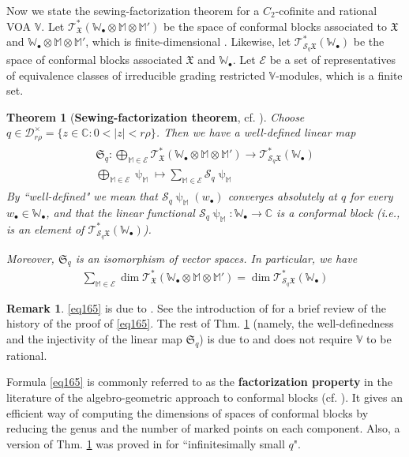 \documentclass[11pt,b5paper,notitlepage]{article}
\theoremstyle{definition}
\newtheorem{rem}[df]{Remark}
\theoremstyle{plain}
\newtheorem{thm}[df]{Theorem}
\newcommand{\fk}{\mathfrak}
\newcommand{\mc}{\mathcal}
\newcommand{\scr}{\mathscr}
\newcommand{\blt}{\bullet}
\newcommand{\Vbb}{\mathbb V}
\newcommand{\Wbb}{\mathbb W}
\newcommand{\Mbb}{\mathbb M}
\newcommand{\Cbb}{\mathbb C}
\newcommand{\<}{\left\langle}
\renewcommand{\>}{\right\rangle}
\newcommand{\fx}{\mathfrak{X}}
\numberwithin{equation}{subsection}
\begin{document}
Now we state the sewing-factorization theorem for a $C_2$-cofinite and rational VOA $\Vbb$. Let $\scr T_{\fx}^*(\Wbb_\blt\otimes\Mbb\otimes\Mbb')$ be the space of conformal blocks associated to $\fx$ and $\Wbb_\blt\otimes\Mbb\otimes\Mbb'$, which is finite-dimensional \cite{AN03-finite-dimensional,DGT2}. Likewise, let $\scr T_{\mc S_q\fx}^*(\Wbb_\blt)$ be the space of conformal blocks associated $\fx$ and $\Wbb_\blt$. Let $\mc E$ be a set of representatives of equivalence classes of irreducible grading restricted $\Vbb$-modules, which is a finite set.

\begin{thm}[\textbf{Sewing-factorization theorem}, cf. {\cite[Thm. 12.1]{Gui-sewingconvergence}}]  \label{lb77}
Choose $q\in\mc D_{r\rho}^\times=\{z\in\Cbb:0<|z|<r\rho\}$. Then we have a well-defined linear map
\begin{gather}\label{eq170}
\begin{gathered}
\fk S_q:\bigoplus_{\Mbb\in\mc E} \scr T_{\fx}^*(\Wbb_\blt\otimes\Mbb\otimes\Mbb')\rightarrow \scr T_{\mc S_q\fx}^*(\Wbb_\blt)\\
\bigoplus_{\Mbb\in\mc E}\uppsi_\Mbb\mapsto \sum_{\Mbb\in\mc E} \mc S_q\uppsi_\Mbb
\end{gathered}
\end{gather}
By ``well-defined" we mean that  $\mc S_q\uppsi_\Mbb(w_\blt)$ converges absolutely at $q$ for every $w_\blt\in\Wbb_\blt$, and that the linear functional $\mc S_q\uppsi_\Mbb:\Wbb_\blt\rightarrow\Cbb$ is a conformal block (i.e., is an element of $\scr T_{\mc S_q\fx}^*(\Wbb_\blt)$). 

Moreover, $\fk S_q$ is an isomorphism of vector spaces. In particular, we have
\begin{align}
\sum_{\Mbb\in\mc E} \dim\scr T_{\fx}^*(\Wbb_\blt\otimes\Mbb\otimes\Mbb')=\dim \scr T_{\mc S_q\fx}^*(\Wbb_\blt)  \label{eq165}
\end{align}
\end{thm}


\begin{rem}\label{lb78}
\eqref{eq165} is due to \cite[Thm. 7.0.1]{DGT2}. See the introduction of \cite{DGT2} for a brief review of the history of the proof of \eqref{eq165}. The rest of Thm. \ref{lb77} (namely, the well-definedness and the injectivity of the linear map $\fk S_q$) is due to \cite[Thm. 12.1]{Gui-sewingconvergence} and does not require $\Vbb$ to be rational.
\end{rem}

Formula \eqref{eq165} is commonly referred to as the \textbf{factorization property} in the literature of the algebro-geometric approach to conformal blocks (cf. \cite{TUY,BFM-conformal-blocks,NT-P1_conformal_blocks}). It gives an efficient way of computing the dimensions of spaces of conformal blocks by reducing the genus and the number of marked points on each component. Also, a version of Thm. \ref{lb77} was proved in \cite[Thm. 8.5.1]{DGT2} for ``infinitesimally small $q$".
\end{document}
